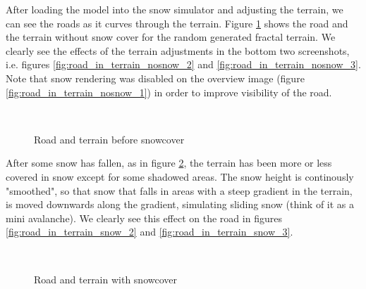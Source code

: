 
After loading the model into the snow simulator and adjusting the terrain, we can see the roads as it curves through the terrain. Figure \ref{fig:road_in_terrain_nosnow} shows the road and the terrain without snow cover for the random generated fractal terrain. We clearly see the effects of the terrain adjustments in the bottom two screenshots, i.e. figures \ref{fig:road_in_terrain_nosnow_2} and \ref{fig:road_in_terrain_nosnow_3}. Note that snow rendering was disabled on the overview image (figure \ref{fig:road_in_terrain_nosnow_1}) in order to improve visibility of the road. 

\begin{figure}[ht]
\centering
{}\\
\quad
{}
\caption{Road and terrain before snowcover}
\label{fig:road_in_terrain_nosnow}
\end{figure}

After some snow has fallen, as in figure \ref{fig:road_in_terrain_snow}, the terrain has been more or less covered in snow except for some shadowed areas. The snow height is continously "smoothed", so that snow that falls in areas with a steep gradient in the terrain, is moved downwards along the gradient, simulating sliding snow (think of it as a mini avalanche). We clearly see this effect on the road in figures \ref{fig:road_in_terrain_snow_2} and \ref{fig:road_in_terrain_snow_3}.

\begin{figure}[ht]
\centering
{}\\
\quad
{}
\caption{Road and terrain with snowcover}
\label{fig:road_in_terrain_snow}
\end{figure}

